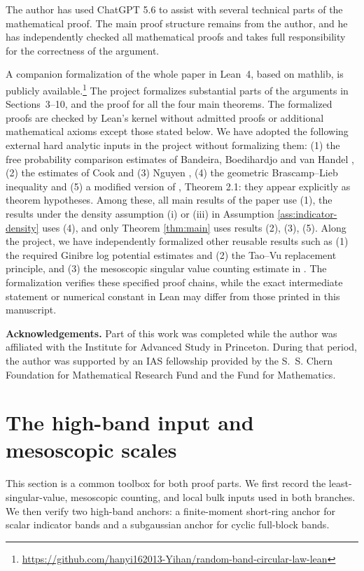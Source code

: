 \documentclass[11pt,reqno]{amsart}
\numberwithin{equation}{section}
\theoremstyle{definition}
\theoremstyle{remark}
\newcommand{\1}{\mathbf 1}
\begin{document}
The author has used ChatGPT 5.6 to assist with several technical parts of the mathematical proof. The main proof structure remains from the author, and he has independently checked all mathematical proofs and takes full responsibility for the correctness of the argument.


A companion formalization of the whole paper in Lean~4, based on mathlib, is publicly
available.\footnote{\url{https://github.com/hanyi162013-Yihan/random-band-circular-law-lean}}
The project formalizes substantial parts of the arguments in
Sections~3--10, and the proof for all the four main theorems. The formalized
proofs are checked by Lean's kernel without admitted proofs or additional
mathematical axioms except those stated below. We have adopted the following external hard analytic inputs in the project without formalizing them: (1) the free probability comparison
estimates of Bandeira, Boedihardjo and van Handel \cite{bandeira2023matrix}, (2) the estimates of Cook \cite{Cook}
and (3) Nguyen \cite{Nguyen}, (4) the geometric Brascamp--Lieb inequality and (5) a modified version of \cite{JainJanaLuhORourke2021}, Theorem 2.1: they appear explicitly as theorem hypotheses. Among these, all main results of the paper use (1), the results under the density assumption (i) or (iii) in Assumption \ref{ass:indicator-density} uses (4), and only Theorem \ref{thm:main} uses results (2), (3), (5).
Along the project, we have independently formalized other reusable results such as (1) the required Ginibre log potential estimates
 and (2) the Tao--Vu replacement principle, and (3) the mesoscopic singular value counting estimate in \cite{Han2410}.
The formalization verifies these specified proof chains, while the exact intermediate statement or numerical constant in Lean may differ from those printed in this manuscript.



\medskip\noindent\textbf{Acknowledgements.}
Part of this work was completed while the author was affiliated with the
Institute for Advanced Study in Princeton.  During that period, the author
was supported by an IAS fellowship provided by the S.~S. Chern Foundation
for Mathematical Research Fund and the Fund for Mathematics.

\section{The high-band input and mesoscopic scales}
\label{sec:high-band-input}
This section is a common toolbox for both proof parts.  We first record the
least-singular-value, mesoscopic counting, and local bulk inputs used in
both branches.  We then verify two high-band anchors: a finite-moment
short-ring anchor for scalar indicator bands and a subgaussian anchor for
cyclic full-block bands.
\end{document}

